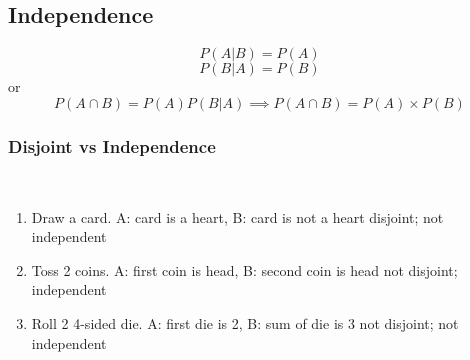\subsection{Independence}  %
\begin{equation}
    P(A\vert B)=P(A)
\end{equation}
\begin{equation}
    P(B\vert A)=P(B)
\end{equation}
or
\begin{equation}
    P(A\cap B)=P(A)P(B\vert A)\implies P(A\cap B)=P(A)\times P(B)
\end{equation}
\subsubsection{Disjoint vs Independence}  %
 \\
\begin{enumerate}
    \item Draw a card. A: card is a heart, B: card is not a heart
          \subitem disjoint; not independent
    \item Toss 2 coins. A: first coin is head, B: second coin is head
          \subitem not disjoint; independent
    \item Roll 2 4-sided die. A: first die is 2, B: sum of die is 3
          \subitem not disjoint; not independent
\end{enumerate}
